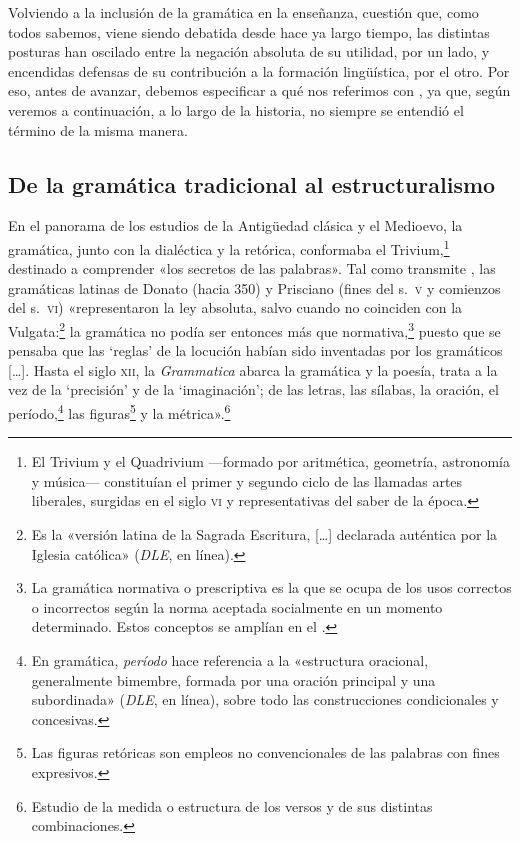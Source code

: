 Volviendo a la inclusión de la gramática en la enseñanza, cuestión que, como
todos sabemos, viene siendo debatida desde hace ya largo tiempo, las distintas
posturas han oscilado entre la negación absoluta de su utilidad, por un lado, y
encendidas defensas de su contribución a la formación lingüística, por el otro.
Por eso, antes de avanzar, debemos especificar a qué nos referimos con
, ya que, según veremos a continuación, a lo largo de la
historia, no siempre se entendió el término de la misma manera.

\subsection{De la gramática tradicional al estructuralismo}

En el panorama de los estudios de la Antigüedad clásica y el Medioevo, la
gramática, junto con la dialéctica y la retórica, conformaba el
Trivium,\footnote{El Trivium y el Quadrivium ---formado por aritmética,
geometría, astronomía y música--- constituían el primer y segundo ciclo de las
llamadas artes liberales, surgidas en el siglo \textsc{vi} y representativas
del saber de la época.} destinado a comprender «los secretos de las palabras».
Tal como transmite \textcite[108]{barthes1993}, las gramáticas latinas de
Donato (hacia 350) y Prisciano (fines del s.~\textsc{v} y comienzos del
s.~\textsc{vi}) «representaron la ley absoluta, salvo cuando no coinciden con
la Vulgata:\footnote{Es la «versión latina de la Sagrada Escritura, [\ldots]
declarada auténtica por la Iglesia católica» (\textit{DLE}, en línea).} la
gramática no podía ser entonces más que normativa,\footnote{La gramática
normativa o prescriptiva es la que se ocupa de los usos correctos o incorrectos
según la norma aceptada socialmente en un momento determinado. Estos conceptos
se amplían en el .} puesto que se pensaba que las \enquote*{reglas}
de la locución habían sido inventadas por los gramáticos [\ldots]. Hasta el
siglo \textsc{xii}, la \textit{Grammatica} abarca la gramática y la poesía,
trata a la vez de la \enquote*{precisión} y de la \enquote*{imaginación}; de las
letras, las sílabas, la oración, el período,\footnote{En gramática,
\textit{período} hace referencia a la «estructura oracional, generalmente
bimembre, formada por una oración principal y una subordinada» (\textit{DLE},
en línea), sobre todo las construcciones condicionales y concesivas.} las
figuras\footnote{Las figuras retóricas son empleos no convencionales de las
palabras con fines expresivos.} y la métrica».\footnote{Estudio de la medida o
estructura de los versos y de sus distintas combinaciones.}

